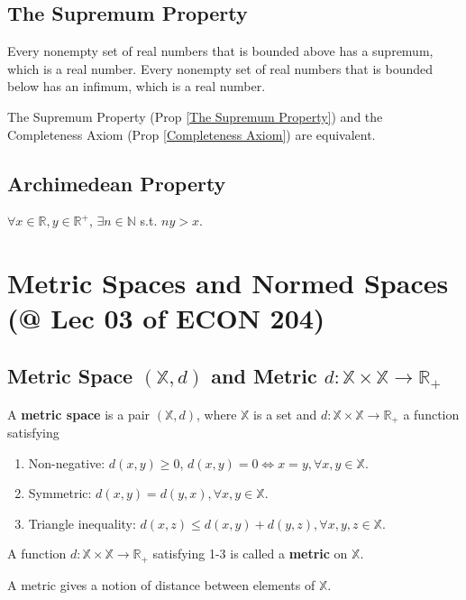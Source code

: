 \documentclass[11pt]{elegantbook}
\begin{document}
\subsection{The Supremum Property}
\begin{proposition}\label{The Supremum Property}
    \normalfont
    Every nonempty set of real numbers that is bounded above has a supremum, which is a real number. Every nonempty set of real numbers that is bounded below has an infimum, which is a real number.
\end{proposition}

\begin{theorem}
    The Supremum Property (Prop \ref{The Supremum Property}) and the Completeness Axiom (Prop \ref{Completeness Axiom}) are equivalent.
\end{theorem}

\subsection{Archimedean Property}
\begin{theorem}
    $\forall x\in \mathbb{R}, y\in \mathbb{R}^+$, $\exists n\in \mathbb{N}$ s.t. $ny>x$.
\end{theorem}

\section{Metric Spaces and Normed Spaces \small{(@ Lec 03 of ECON 204)}}
\subsection{Metric Space $(\mathbb{X}, d)$ and Metric $d : \mathbb{X} \times \mathbb{X} \rightarrow \mathbb{R}_+$}
\begin{definition}
\normalfont
    A \textbf{metric space} is a pair $(\mathbb{X}, d)$, where $\mathbb{X}$ is a set and $d : \mathbb{X} \times \mathbb{X} \rightarrow \mathbb{R}_+$ a function satisfying
    \begin{enumerate}
        \item Non-negative: $d(x,y)\geq 0$, $d(x,y)=0\Leftrightarrow x=y, \forall x,y\in \mathbb{X}$.
        \item Symmetric: $d(x,y)=d(y,x), \forall x,y\in \mathbb{X}$.
        \item Triangle inequality: $d(x,z)\leq d(x,y)+d(y,z), \forall x,y,z\in \mathbb{X}$.
    \end{enumerate}
    A function $d : \mathbb{X} \times \mathbb{X} \rightarrow \mathbb{R}_+$ satisfying 1-3 is called a \textbf{metric} on $\mathbb{X}$.
\end{definition}
A metric gives a notion of distance between elements of $\mathbb{X}$.
\end{document}
